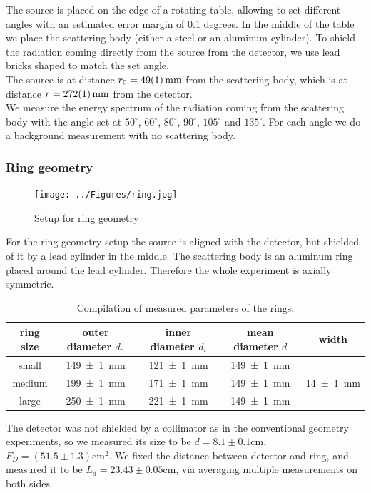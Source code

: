 \documentclass[a4paper,12pt]{article}
\begin{document}
The source is placed on the edge of a rotating table, allowing to set different angles with an estimated error margin of 0.1 degrees. In the middle of the table we place the scattering body (either a steel or an aluminum cylinder). To shield the radiation coming directly from the source from the detector, we use lead bricks shaped to match the set angle.\\
The source is at distance $r_0 = \SI{49+-1}{mm}$ from the scattering body, which is at distance $r = \SI{272+-1}{mm}$ from the detector.\\
We measure the energy spectrum of the radiation coming from the scattering body with the angle set at $50^\circ$, $60^\circ$, $80^\circ$, $90^\circ$, $105^\circ$ and $135^\circ$. For each angle we do a background measurement with no scattering body.

\subsubsection{Ring geometry}

\begin{figure}[H]
	\centering
	\texttt{[image: ../Figures/ring.jpg]}
	\caption{Setup for ring geometry}
	\label{setCalib}
\end{figure}

For the ring geometry setup the source is aligned with the detector, but shielded of it by a lead cylinder in the middle. The scattering body is an aluminum ring placed around the lead cylinder. Therefore the whole experiment is axially symmetric.

\begin{table}[H]
	\renewcommand{\arraystretch}{1.5}
	\centering
	\begin{tabular}{|c|c|c|c|c|}
		\hline
		ring size & outer diameter $d_o$ & inner diameter $d_i$ & mean diameter $d$ & width\\
		\hline
		small & \SI{149+-1}{mm} & \SI{121+-1}{mm} & \SI{149+-1}{mm} & \multirow{3}{*}{\SI{14+-1}{mm}} \\
		\cline{1-4}
		medium & \SI{199+-1}{mm} & \SI{171+-1}{mm} & \SI{149+-1}{mm} & \\
		\cline{1-4}
		large & \SI{250+-1}{mm} & \SI{221+-1}{mm} & \SI{149+-1}{mm} & \\
		\hline
	\end{tabular}
	\caption{Compilation of measured parameters of the rings. }
	\label{tab:rings }
\end{table}

The detector was not shielded by a collimator as in the conventional geometry experiments, so we measured its size to be $d = 8.1 \pm 0.1$cm, $F_D = (51.5\pm1.3)\si{\centi\meter\squared}$. We fixed the distance between detector and ring, and measured it to be $L_d = 23.43 \pm 0.05$cm, via averaging multiple measurements on both sides.
\end{document}
